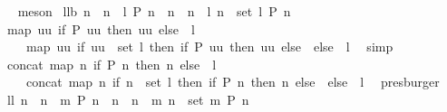 \begin{isabellebody}
\isadelimproof
\ %
\endisadelimproof
%
\isatagproof
{}\isamarkupfalse%
\ meson%
\endisatagproof
{\isafoldproof}%
%
\isadelimproof
%
\endisadelimproof
\isanewline
\isanewline
{}\isamarkupfalse%
\ ll{}b{\isacharcolon}\ {\isachardoublequoteopen}{\isacharbrackleft}n\ {\isachardot}\ n\ {\isacharless}{\isacharminus}\ l{\isacharcomma}\ P\ n{\isacharbrackright}\ {\isacharequal}\ {\isacharbrackleft}n\ {\isachardot}\ n\ {\isacharless}{\isacharminus}\ l{\isacharcomma}\ n\ {\isasymin}\ set\ l{\isacharcomma}\ P\ n{\isacharbrackright}{\isachardoublequoteclose}\ \isanewline
%
\isadelimproof
%
\endisadelimproof
%
\isatagproof
{}\isamarkupfalse%
\ {\isacharminus}\ \isanewline
\ \isanewline
\ \ \isamarkupfalse%
\ {\isachardoublequoteopen}map\ {\isacharparenleft}{\isasymlambda}uu{\isachardot}\ if\ P\ uu\ then\ {\isacharbrackleft}uu{\isacharbrackright}\ else\ {\isacharbrackleft}{\isacharbrackright}{\isacharparenright}\ l\ {\isacharequal}\ \isanewline
\ \ \ \ map\ {\isacharparenleft}{\isasymlambda}uu{\isachardot}\ if\ uu\ {\isasymin}\ set\ l\ then\ if\ P\ uu\ then\ {\isacharbrackleft}uu{\isacharbrackright}\ else\ {\isacharbrackleft}{\isacharbrackright}\ else\ {\isacharbrackleft}{\isacharbrackright}{\isacharparenright}\ l{\isachardoublequoteclose}\ \isamarkupfalse%
\ simp\isanewline
\ \ \isamarkupfalse%
\ {\isachardoublequoteopen}concat\ {\isacharparenleft}map\ {\isacharparenleft}{\isasymlambda}n{\isachardot}\ if\ P\ n\ then\ {\isacharbrackleft}n{\isacharbrackright}\ else\ {\isacharbrackleft}{\isacharbrackright}{\isacharparenright}\ l{\isacharparenright}\ {\isacharequal}\ \isanewline
\ \ \ \ concat\ {\isacharparenleft}map\ {\isacharparenleft}{\isasymlambda}n{\isachardot}\ if\ n\ {\isasymin}\ set\ l\ then\ if\ P\ n\ then\ {\isacharbrackleft}n{\isacharbrackright}\ else\ {\isacharbrackleft}{\isacharbrackright}\ else\ {\isacharbrackleft}{\isacharbrackright}{\isacharparenright}\ l{\isacharparenright}{\isachardoublequoteclose}\ \isamarkupfalse%
\ presburger\isanewline
{}\isamarkupfalse%
%
\endisatagproof
{\isafoldproof}%
%
\isadelimproof
\isanewline
%
\endisadelimproof
\isanewline
{}\isamarkupfalse%
\ ll{}{\isacharcolon}\ {\isachardoublequoteopen}{\isacharbrackleft}n\ {\isachardot}\ n\ {\isacharless}{\isacharminus}\ {\isacharbrackleft}{}{\isachardot}{\isachardot}{\isacharless}m{\isacharbrackright}{\isacharcomma}\ P\ n{\isacharbrackright}\ {\isacharequal}\ {\isacharbrackleft}n\ {\isachardot}\ n\ {\isacharless}{\isacharminus}\ {\isacharbrackleft}{}{\isachardot}{\isachardot}{\isacharless}m{\isacharbrackright}{\isacharcomma}\ n\ {\isasymin}\ set\ {\isacharbrackleft}{}{\isachardot}{\isachardot}{\isacharless}m{\isacharbrackright}{\isacharcomma}\ P\ n{\isacharbrackright}{\isachardoublequoteclose}%

\end{isabellebody}
